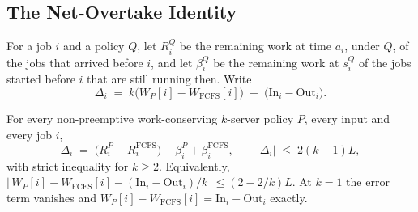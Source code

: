 \subsection{The Net-Overtake Identity}
\label{sec:th_identity}

For a job $i$ and a policy $Q$, let $R^Q_i$ be the remaining work at time $a_i$, under $Q$,
of the jobs that arrived before $i$, and let $\beta^Q_i$ be the remaining work at $s^Q_i$
of the jobs started before $i$ that are still running then. Write
\begin{equation}
  \Delta_i \;=\; k\bigl(W_P[i] - W_{\mathrm{FCFS}}[i]\bigr)
              \;-\; \bigl(\mathrm{In}_i - \mathrm{Out}_i\bigr).
  \label{eq:delta}
\end{equation}

\begin{theorem}
\label{thm:identity}
For every non-preemptive work-conserving $k$-server policy $P$, every input and every job
$i$,
\begin{equation}
  \Delta_i \;=\; \bigl(R^P_i - R^{\mathrm{FCFS}}_i\bigr) - \beta^P_i + \beta^{\mathrm{FCFS}}_i ,
  \qquad
  \bigl|\Delta_i\bigr| \;\le\; 2(k-1)L ,
  \label{eq:identity}
\end{equation}
with strict inequality for $k \ge 2$. Equivalently,
$\bigl|\,W_P[i] - W_{\mathrm{FCFS}}[i] - (\mathrm{In}_i - \mathrm{Out}_i)/k\,\bigr| \le (2 - 2/k)L$.
At $k = 1$ the error term vanishes and $W_P[i] - W_{\mathrm{FCFS}}[i] = \mathrm{In}_i -
\mathrm{Out}_i$ exactly.
\end{theorem}

